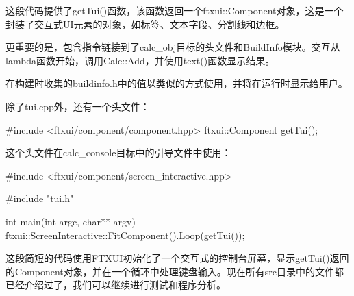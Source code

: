 这段代码提供了getTui()函数，该函数返回一个ftxui::Component对象，这是一个封装了交互式UI元素的对象，如标签、文本字段、分割线和边框。

更重要的是，包含指令链接到了calc\_obj目标的头文件和BuildInfo模块。交互从lambda函数开始，调用Calc::Add，并使用text()函数显示结果。

在构建时收集的buildinfo.h中的值以类似的方式使用，并将在运行时显示给用户。

除了tui.cpp外，还有一个头文件：


\begin{cpp}
#include <ftxui/component/component.hpp>
ftxui::Component getTui();
\end{cpp}

这个头文件在calc\_console目标中的引导文件中使用：


\begin{cpp}
#include <ftxui/component/screen_interactive.hpp>

#include "tui.h"

int main(int argc, char** argv) {
    ftxui::ScreenInteractive::FitComponent().Loop(getTui());
}
\end{cpp}

这段简短的代码使用FTXUI初始化了一个交互式的控制台屏幕，显示getTui()返回的Component对象，并在一个循环中处理键盘输入。现在所有src目录中的文件都已经介绍过了，我们可以继续进行测试和程序分析。


























